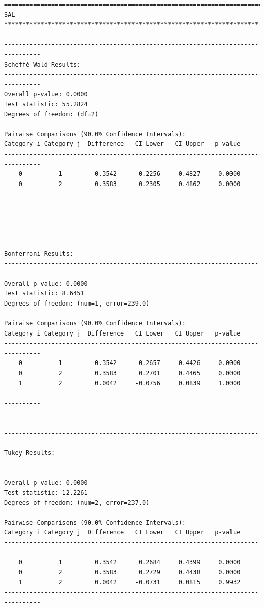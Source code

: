 \begin{lstlisting}
================================================================================
SAL **********************************************************************

--------------------------------------------------------------------------------
Scheffé-Wald Results:
--------------------------------------------------------------------------------
Overall p-value: 0.0000
Test statistic: 55.2824
Degrees of freedom: (df=2)

Pairwise Comparisons (90.0% Confidence Intervals):
Category i Category j  Difference   CI Lower   CI Upper   p-value  
--------------------------------------------------------------------------------
    0          1         0.3542      0.2256     0.4827     0.0000  
    0          2         0.3583      0.2305     0.4862     0.0000  
--------------------------------------------------------------------------------


--------------------------------------------------------------------------------
Bonferroni Results:
--------------------------------------------------------------------------------
Overall p-value: 0.0000
Test statistic: 8.6451
Degrees of freedom: (num=1, error=239.0)

Pairwise Comparisons (90.0% Confidence Intervals):
Category i Category j  Difference   CI Lower   CI Upper   p-value  
--------------------------------------------------------------------------------
    0          1         0.3542      0.2657     0.4426     0.0000  
    0          2         0.3583      0.2701     0.4465     0.0000  
    1          2         0.0042     -0.0756     0.0839     1.0000  
--------------------------------------------------------------------------------


--------------------------------------------------------------------------------
Tukey Results:
--------------------------------------------------------------------------------
Overall p-value: 0.0000
Test statistic: 12.2261
Degrees of freedom: (num=2, error=237.0)

Pairwise Comparisons (90.0% Confidence Intervals):
Category i Category j  Difference   CI Lower   CI Upper   p-value  
--------------------------------------------------------------------------------
    0          1         0.3542      0.2684     0.4399     0.0000  
    0          2         0.3583      0.2729     0.4438     0.0000  
    1          2         0.0042     -0.0731     0.0815     0.9932  
--------------------------------------------------------------------------------


\end{lstlisting}
